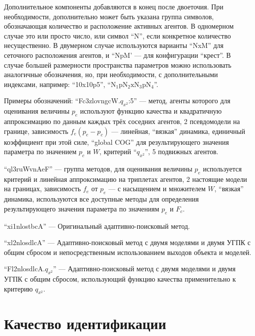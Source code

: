 Дополнительное компоненты добавляются в конец после двоеточия.
При необходимости, дополнительно может быть указана группа символов, обозначающая количество
и расположение активных агентов.
В одномерном случае это или просто число, или символ ``N'', если
конкретное количество несущественно. В двумерном случае
используются варианты ``NxM'' для сеточного расположения агентов,
и ``NpM'  --- для конфигурации ``крест''. В случае большей размерности
пространства параметров можно использовать аналогичные обозначения,
но, при необходимости, с дополнительными индексами, например:
``10x10p5'', ``$\mathrm{N_1 p N_2 x N_3 p N_4}$''.



Примеры обозначений:
``Fc3zlovngcW.$q_{x^2}$:5''
--- метод, агенты которого
для оценивания величины $p_e$ используют функцию качества и квадратичную аппроксимацию
по данным каждых трёх соседних агентов, 2 псевдомодели на границе,
зависимость $f_e(p_e-p_c)$ --- линейная, ``вязкая'' динамика,
единичный коэффициент при этой силе,
``global COG'' для результирующего значения параметра по значением $p_c$ и $W$,
критерий ``$q_{x^2}$'', 5 подвижных агентов.


``ql3ruWvnAeF''
--- группа методов,
для оценивания величины $p_e$ используется критерий и линейная аппроксимацию на триплетах агентов,
2 настоящие модели на границах,
зависимость $f_e$ от $p_e$ --- с насыщением и множителем $W$, ``вязкая'' динамика,
используются все доступные методы для определения  результирующего значения параметра
по значениям $p_e$ и $F_c$.

``xi1nlostbcA'' --- Оригинальный адаптивно-поисковый метод.

``xl2nlosdlcA'' --- Адаптивно-поисковый метод с двумя моделями и двумя УГПК с общим сбросом
 и непосредственным использованием выходов объекта и моделей.

``Fl2nlosdlcA.$q_{x^2}$'' --- Адаптивно-поисковый метод с двумя моделями и двумя УГПК с общим сбросом,
 использующий функцию качества применительно к критерию $q_{x^2}$.





\section{Качество идентификации}  %

